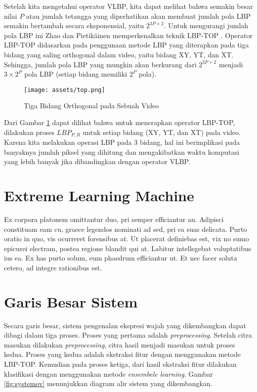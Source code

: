\documentclass[review,3p,12pt]{elsarticle}
\begin{document}
Setelah kita mengetahui operator VLBP, kita dapat melihat bahwa semakin besar nilai $P$ atau jumlah tetangga yang diperhatikan akan membuat jumlah pola LBP semakin bertambah secara eksponensial, yaitu $2^{3P+2}$. Untuk mengurangi jumlah pola LBP ini Zhao dan Pietik\"{a}inen memperkenalkan teknik LBP-TOP \cite{zhao2007dynamic2}. Operator LBP-TOP didasarkan pada penggunaan metode LBP yang diterapkan pada tiga bidang yang saling orthogonal dalam video, yaitu bidang XY, YT, dan XT. Sehingga, jumlah pola LBP yang mungkin akan berkurang dari $2^{3P+2}$ menjadi $3 \times 2^P$ pola LBP (setiap bidang memiliki $2^P$ pola).
\begin{figure}[hbt!]
\caption{Tiga Bidang Orthogonal pada Sebuah Video \cite{zhao2007dynamic2}}
\label{fig:top}
\centering
	\texttt{[image: assets/top.png]}
\end{figure}

Dari Gambar \ref{fig:top} dapat dilihat bahwa untuk menerapkan operator LBP-TOP, dilakukan proses $LBP_{P,R}$ untuk setiap bidang (XY, YT, dan XT) pada video. Karena kita melakukan operasi LBP pada 3 bidang, hal ini berimplikasi pada banyaknya jumlah piksel yang dihitung dan mengakibatkan waktu komputasi yang lebih banyak jika dibandingkan dengan operator VLBP.


\section{Extreme Learning Machine}
Ex corpora platonem omittantur duo, pri semper efficiantur an. Adipisci constituam eam cu, graece legendos nominati ad sed, pri ea suas delicata. Purto oratio in quo, vis ocurreret forensibus at. Ut placerat definiebas est, vix no sumo epicurei electram, postea regione blandit qui at. Labitur intellegebat voluptatibus ius ea. Ex has purto solum, eum phaedrum efficiantur ut. Et nec facer soluta cetero, ad integre rationibus est.


\section{Garis Besar Sistem}
\label{bigsystem}

Secara garis besar, sistem pengenalan ekspresi wajah yang dikembangkan dapat dibagi dalam tiga proses. Proses yang pertama adalah \textit{preprocessing}. Setelah citra masukan dilakukan \textit{preprocessing}, citra hasil menjadi masukan untuk proses kedua. Proses yang kedua adalah ekstraksi fitur dengan menggunakan metode LBP-TOP. Kemudian pada proses ketiga, dari hasil ekstraksi fitur dilakukan klasifikasi dengan menggunakan metode \textit{ensembele learning}. Gambar \ref{fig:systemov} menunjukkan diagram alir sistem yang dikembangkan.
\end{document}
